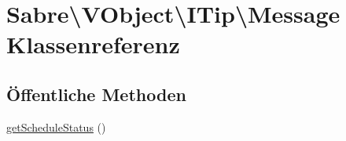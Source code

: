 \hypertarget{class_sabre_1_1_v_object_1_1_i_tip_1_1_message}{}\section{Sabre\textbackslash{}V\+Object\textbackslash{}I\+Tip\textbackslash{}Message Klassenreferenz}
\label{class_sabre_1_1_v_object_1_1_i_tip_1_1_message}
\subsection*{Öffentliche Methoden}
\begin{DoxyCompactItemize}
\item 
\mbox{\hyperlink{class_sabre_1_1_v_object_1_1_i_tip_1_1_message_a4b4eb4cf2f7947e7e3d4c7331fca237a}{get\+Schedule\+Status}} ()
\end{DoxyCompactItemize}
